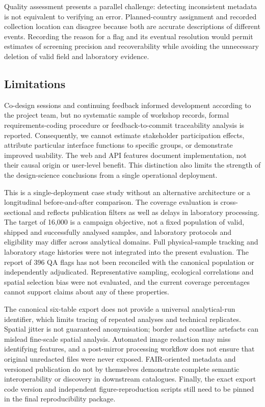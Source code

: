 \documentclass[11pt,a4paper]{article}
\begin{document}
Quality assessment presents a parallel challenge: detecting inconsistent metadata is not equivalent to verifying an error. Planned-country assignment and recorded collection location can disagree because both are accurate descriptions of different events. Recording the reason for a flag and its eventual resolution would permit estimates of screening precision and recoverability while avoiding the unnecessary deletion of valid field and laboratory evidence.

\subsection{Limitations}
Co-design sessions and continuing feedback informed development according to the project team, but no systematic sample of workshop records, formal requirements-coding procedure or feedback-to-commit traceability analysis is reported. Consequently, we cannot estimate stakeholder participation effects, attribute particular interface functions to specific groups, or demonstrate improved usability. The web and API features document implementation, not their causal origin or user-level benefit. This distinction also limits the strength of the design-science conclusions from a single operational deployment.

This is a single-deployment case study without an alternative architecture or a longitudinal before-and-after comparison. The coverage evaluation is cross-sectional and reflects publication filters as well as delays in laboratory processing. The target of 16,000 is a campaign objective, not a fixed population of valid, shipped and successfully analysed samples, and laboratory protocols and eligibility may differ across analytical domains. Full physical-sample tracking and laboratory stage histories were not integrated into the present evaluation. The report of 396 QA flags has not been reconciled with the canonical population or independently adjudicated. Representative sampling, ecological correlations and spatial selection bias were not evaluated, and the current coverage percentages cannot support claims about any of these properties.

The canonical six-table export does not provide a universal analytical-run identifier, which limits tracing of repeated analyses and technical replicates. Spatial jitter is not guaranteed anonymisation; border and coastline artefacts can mislead fine-scale spatial analysis. Automated image redaction may miss identifying features, and a post-mirror processing workflow does not ensure that original unredacted files were never exposed. FAIR-oriented metadata and versioned publication do not by themselves demonstrate complete semantic interoperability or discovery in downstream catalogues. Finally, the exact export code version and independent figure-reproduction scripts still need to be pinned in the final reproducibility package.
\end{document}
